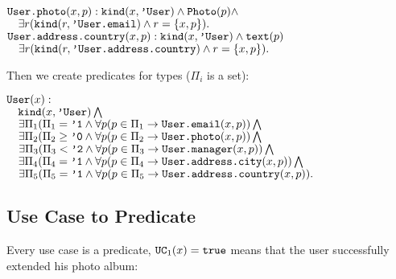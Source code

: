 \documentclass{article}
\begin{document}
        \begin{maths}
        $\mbox{\texttt{User.photo}}(x, p): \mbox{\texttt{kind}}(x, \mbox{\texttt{'User}}) \wedge \mbox{\texttt{Photo}}(p) \wedge$ \\
        $\quad \exists r (\mbox{\texttt{kind}}(r, \mbox{\texttt{'User.email}}) \wedge r = \{x, p\}). $ \\
        $\mbox{\texttt{User.address.country}}(x, p): \mbox{\texttt{kind}}(x, \mbox{\texttt{'User}}) \wedge \mbox{\texttt{text}}(p)$ \\
        $\quad \exists r (\mbox{\texttt{kind}}(r, \mbox{\texttt{'User.address.country}}) \wedge r = \{x, p\}). $ \\
        \end{maths}
        
        Then we create predicates for types ($\Pi_i$ is a set):

        \begin{maths}
        $\mbox{\texttt{User}}(x) :$ \\
        $\quad \mbox{\texttt{kind}}(x, \mbox{\texttt{'User}}) \bigwedge$ \\
        $\quad \exists \Pi_1 (\Pi_1 = \mbox{\texttt{'1}} \wedge \forall p(p \in \Pi_1 \to \mbox{\texttt{User.email}}(x, p)) \bigwedge$ \\
        $\quad \exists \Pi_2 (\Pi_2 \geq \mbox{\texttt{'0}} \wedge \forall p(p \in \Pi_2 \to \mbox{\texttt{User.photo}}(x, p)) \bigwedge$ \\
        $\quad \exists \Pi_3 (\Pi_3 < \mbox{\texttt{'2}} \wedge \forall p(p \in \Pi_3 \to \mbox{\texttt{User.manager}}(x, p)) \bigwedge $ \\
        $\quad \exists \Pi_4 (\Pi_4 = \mbox{\texttt{'1}} \wedge \forall p(p \in \Pi_4 \to \mbox{\texttt{User.address.city}}(x, p)) \bigwedge $ \\
        $\quad \exists \Pi_5 (\Pi_5 = \mbox{\texttt{'1}} \wedge \forall p(p \in \Pi_5 \to \mbox{\texttt{User.address.country}}(x, p)). $ \\
        \end{maths}

    \subsection{Use Case to Predicate}

        Every use case is a predicate, $\mbox{\texttt{UC}}_1(x) = \mbox{\texttt{true}}$ means that the user
        successfully extended his photo album:
    
\end{document}
